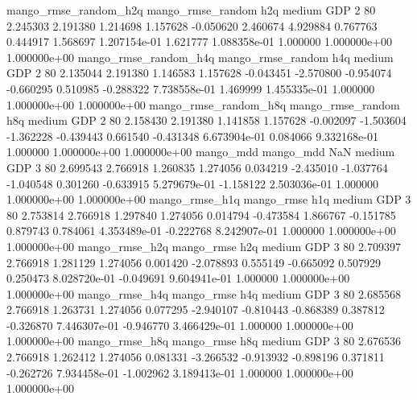 mango_rmse_random_h2q mango_rmse_random                  h2q     medium      GDP                 2 80  2.245303       2.191380 1.214698       1.157628   -0.050620      2.460674      4.929884     0.767763       0.444917  1.568697 1.207154e-01     1.621777   1.088358e-01            1.000000    1.000000e+00        1.000000e+00
mango_rmse_random_h4q mango_rmse_random                  h4q     medium      GDP                 2 80  2.135044       2.191380 1.146583       1.157628   -0.043451     -2.570800     -0.954074    -0.660295       0.510985 -0.288322 7.738558e-01     1.469999   1.455335e-01            1.000000    1.000000e+00        1.000000e+00
mango_rmse_random_h8q mango_rmse_random                  h8q     medium      GDP                 2 80  2.158430       2.191380 1.141858       1.157628   -0.002097     -1.503604     -1.362228    -0.439443       0.661540 -0.431348 6.673904e-01     0.084066   9.332168e-01            1.000000    1.000000e+00        1.000000e+00
            mango_mdd         mango_mdd                  NaN     medium      GDP                 3 80  2.699543       2.766918 1.260835       1.274056    0.034219     -2.435010     -1.037764    -1.040548       0.301260 -0.633915 5.279679e-01    -1.158122   2.503036e-01            1.000000    1.000000e+00        1.000000e+00
       mango_rmse_h1q        mango_rmse                  h1q     medium      GDP                 3 80  2.753814       2.766918 1.297840       1.274056    0.014794     -0.473584      1.866767    -0.151785       0.879743  0.784061 4.353489e-01    -0.222768   8.242907e-01            1.000000    1.000000e+00        1.000000e+00
       mango_rmse_h2q        mango_rmse                  h2q     medium      GDP                 3 80  2.709397       2.766918 1.281129       1.274056    0.001420     -2.078893      0.555149    -0.665092       0.507929  0.250473 8.028720e-01    -0.049691   9.604941e-01            1.000000    1.000000e+00        1.000000e+00
       mango_rmse_h4q        mango_rmse                  h4q     medium      GDP                 3 80  2.685568       2.766918 1.263731       1.274056    0.077295     -2.940107     -0.810443    -0.868389       0.387812 -0.326870 7.446307e-01    -0.946770   3.466429e-01            1.000000    1.000000e+00        1.000000e+00
       mango_rmse_h8q        mango_rmse                  h8q     medium      GDP                 3 80  2.676536       2.766918 1.262412       1.274056    0.081331     -3.266532     -0.913932    -0.898196       0.371811 -0.262726 7.934458e-01    -1.002962   3.189413e-01            1.000000    1.000000e+00        1.000000e+00
